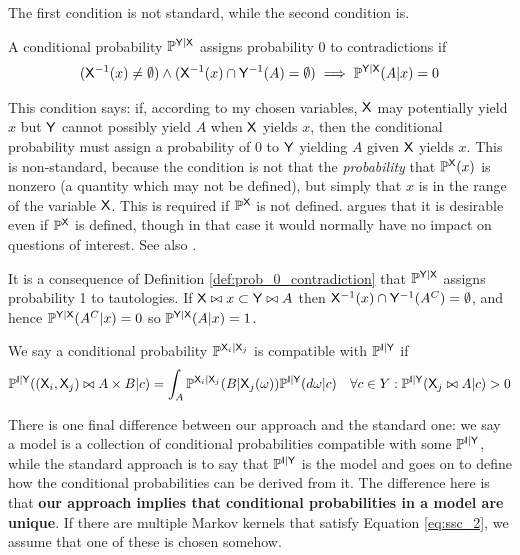 The first condition is not standard, while the second condition is.

\begin{definition}\label{def:prob_0_contradiction}
A conditional probability $\mathbb{P}^{\mathsf{Y}|\mathsf{X}}$ assigns probability 0 to contradictions if 
\begin{align}
	(\mathsf{X}^{-1}(x)\neq \emptyset)\land (\mathsf{X}^{-1}(x)\cap \mathsf{Y}^{-1}(A) = \emptyset) \implies\mathbb{P}^{\mathsf{Y}|\mathsf{X}}(A|x) = 0
\end{align}
\end{definition}

This condition says: if, according to my chosen variables, $\mathsf{X}$ may potentially yield $x$ but $\mathsf{Y}$ cannot possibly yield $A$ when $\mathsf{X}$ yields $x$, then the conditional probability must assign a probability of 0 to $\mathsf{Y}$ yielding $A$ given $\mathsf{X}$ yields $x$. This is non-standard, because the condition is not that the \emph{probability} that $\mathbb{P}^{\mathsf{X}}(x)$ is nonzero (a quantity which may not be defined), but simply that $x$ is in the range of the variable $\mathsf{X}$. This is required if $\mathbb{P}^{\mathsf{X}}$ is not defined. \citet{hajek_what_2003} argues that it is desirable even if $\mathbb{P}^{\mathsf{X}}$ is defined, though in that case it would normally have no impact on questions of interest. See also \citet{renyi_conditional_1956}.

It is a consequence of Definition \ref{def:prob_0_contradiction} that $\mathbb{P}^{\mathsf{Y}|\mathsf{X}}$ assigns probability 1 to tautologies. If $\mathsf{X}\bowtie x\subset \mathsf{Y}\bowtie A$ then $\mathsf{X}^{-1}(x)\cap \mathsf{Y}^{-1}(A^C) = \emptyset$, and hence $\mathbb{P}^{\mathsf{Y}|\mathsf{X}}(A^C|x) = 0$ so $\mathbb{P}^{\mathsf{Y}|\mathsf{X}}(A|x) = 1$.

\begin{definition}\label{def:compat_master}
We say a conditional probability $\mathbb{P}^{\mathsf{X}_i|\mathsf{X}_j}$ is compatible with $\mathbb{P}^{\mathsf{I}|\mathsf{Y}}$ if
\begin{align}
	\mathbb{P}^{\mathsf{I}|\mathsf{Y}}((\mathsf{X}_i,\mathsf{X}_j)\bowtie A\times B|c) &= \int_A \mathbb{P}^{\mathsf{X}_{i}|\mathsf{X}_j}(B|\mathsf{X}_j(\omega))\mathbb{P}^{\mathsf{I}|\mathsf{Y}}(d\omega|c) &\forall c\in Y:\mathbb{P}^{\mathsf{I}|\mathsf{Y}}(\mathsf{X}_j\bowtie A|c)>0 \label{eq:ssc_2}
\end{align}
\end{definition}

There is one final difference between our approach and the standard one: we say a model is a collection of conditional probabilities compatible with some $\mathbb{P}^{\mathsf{I}|\mathsf{Y}}$, while the standard approach is to say that $\mathbb{P}^{\mathsf{I}|\mathsf{Y}}$ is the model and goes on to define how the conditional probabilities can be derived from it. The difference here is that \textbf{our approach implies that conditional probabilities in a model are unique}. If there are multiple Markov kernels that satisfy Equation \ref{eq:ssc_2}, we assume that one of these is chosen somehow. 


